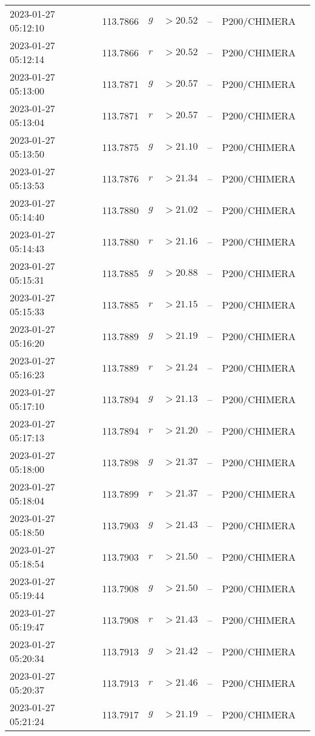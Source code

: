 \documentclass{nature_plusfigure}
\begin{document}
\begin{supplement}
\begin{center}
\begin{longtable}{lllllll}
2023-01-27 05:12:10 & 113.7866 & $g$ & $>20.52$ & -- & P200/CHIMERA &  \\ 
2023-01-27 05:12:14 & 113.7866 & $r$ & $>20.52$ & -- & P200/CHIMERA &  \\ 
2023-01-27 05:13:00 & 113.7871 & $g$ & $>20.57$ & -- & P200/CHIMERA &  \\ 
2023-01-27 05:13:04 & 113.7871 & $r$ & $>20.57$ & -- & P200/CHIMERA &  \\ 
2023-01-27 05:13:50 & 113.7875 & $g$ & $>21.10$ & -- & P200/CHIMERA &  \\ 
2023-01-27 05:13:53 & 113.7876 & $r$ & $>21.34$ & -- & P200/CHIMERA &  \\ 
2023-01-27 05:14:40 & 113.7880 & $g$ & $>21.02$ & -- & P200/CHIMERA &  \\ 
2023-01-27 05:14:43 & 113.7880 & $r$ & $>21.16$ & -- & P200/CHIMERA &  \\ 
2023-01-27 05:15:31 & 113.7885 & $g$ & $>20.88$ & -- & P200/CHIMERA &  \\ 
2023-01-27 05:15:33 & 113.7885 & $r$ & $>21.15$ & -- & P200/CHIMERA &  \\ 
2023-01-27 05:16:20 & 113.7889 & $g$ & $>21.19$ & -- & P200/CHIMERA &  \\ 
2023-01-27 05:16:23 & 113.7889 & $r$ & $>21.24$ & -- & P200/CHIMERA &  \\ 
2023-01-27 05:17:10 & 113.7894 & $g$ & $>21.13$ & -- & P200/CHIMERA &  \\ 
2023-01-27 05:17:13 & 113.7894 & $r$ & $>21.20$ & -- & P200/CHIMERA &  \\ 
2023-01-27 05:18:00 & 113.7898 & $g$ & $>21.37$ & -- & P200/CHIMERA &  \\ 
2023-01-27 05:18:04 & 113.7899 & $r$ & $>21.37$ & -- & P200/CHIMERA &  \\ 
2023-01-27 05:18:50 & 113.7903 & $g$ & $>21.43$ & -- & P200/CHIMERA &  \\ 
2023-01-27 05:18:54 & 113.7903 & $r$ & $>21.50$ & -- & P200/CHIMERA &  \\ 
2023-01-27 05:19:44 & 113.7908 & $g$ & $>21.50$ & -- & P200/CHIMERA &  \\ 
2023-01-27 05:19:47 & 113.7908 & $r$ & $>21.43$ & -- & P200/CHIMERA &  \\ 
2023-01-27 05:20:34 & 113.7913 & $g$ & $>21.42$ & -- & P200/CHIMERA &  \\ 
2023-01-27 05:20:37 & 113.7913 & $r$ & $>21.46$ & -- & P200/CHIMERA &  \\ 
2023-01-27 05:21:24 & 113.7917 & $g$ & $>21.19$ & -- & P200/CHIMERA &  \\ 

\end{longtable}
\end{center}
\end{supplement}
\end{document}
